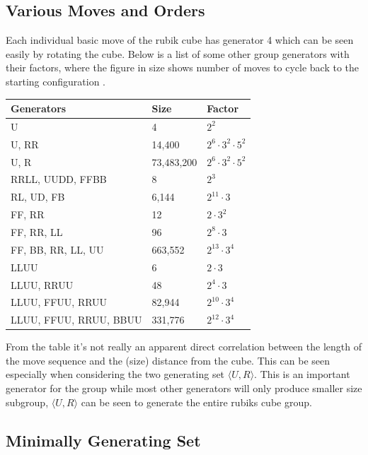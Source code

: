 \documentclass{article}
\begin{document}
\subsection{Various Moves and Orders}

Each individual basic move of the rubik cube has generator 4 which can be seen easily by rotating the cube. Below is a list of some other group generators with their factors, where the figure in size shows number of moves to cycle back to the starting configuration \cite{gentable}.

\begin{center}
\label{:paritytable}
    \begin{tabular}{ | p{7cm} | p{2cm} | p{3cm}|}
    \hline
    Generators & Size & Factor \\ \hline
    U & 4 & $2^2$\\ \hline
    U, RR & 14,400 & $2^6 \cdot 3^2 \cdot 5^2$ \\ \hline
    U, R  & 73,483,200 &$2^6 \cdot 3^2 \cdot 5^2$\\ \hline
    RRLL, UUDD, FFBB & 8 & $2^3$ \\ \hline
    RL, UD, FB & 6,144 & $2^11 \cdot 3$\\ \hline
    FF, RR & 12 &$ 2 \cdot 3^2$\\ \hline
    FF, RR, LL & 96 &$ 2^8 \cdot 3$\\ \hline
	FF, BB, RR, LL, UU & 663,552 &$ 2^13 \cdot 3^4$\\ \hline
    LLUU & 6 & $2 \cdot 3$\\ \hline
    LLUU, RRUU & 48 &$ 2^4 \cdot 3 $\\ \hline
    LLUU, FFUU, RRUU & 82,944 &$ 2^{10} \cdot 3^4$\\ \hline
    LLUU, FFUU, RRUU, BBUU & 331,776 &$ 2^{12} \cdot 3^4 $\\ \hline
    \end{tabular}
\end{center}
From the table it's not really an apparent direct correlation between the length of the move sequence and the (size) distance from the cube. This can be seen especially when considering the two generating set $\langle U,R\rangle$. This is an important generator for the group while most other generators will only produce smaller size subgroup, $\langle U,R\rangle$ can be seen to generate the entire rubiks cube group.

\subsection{Minimally Generating Set}
\end{document}
